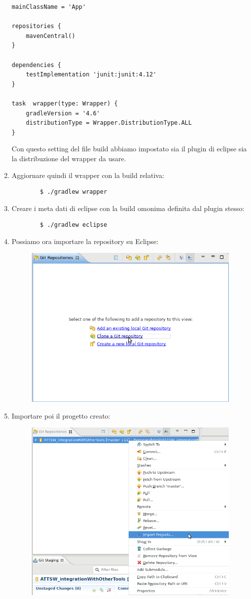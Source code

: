 \begin{enumerate}
\begin{lstlisting}[frame=single]
mainClassName = 'App'

repositories {
    mavenCentral()
}

dependencies {
    testImplementation 'junit:junit:4.12'
}

task  wrapper(type: Wrapper) {
    gradleVersion = '4.6'
    distributionType = Wrapper.DistributionType.ALL
}
    \end{lstlisting}
    Con questo setting del file build abbiamo impostato sia il plugin di eclipse sia la distribuzione del wrapper da usare.
    \item Aggiornare quindi il wrapper con la build relativa:
    \begin{verbatim}
        $ ./gradlew wrapper
    \end{verbatim}
    \item Creare i meta dati di eclipse con la build omonima definita dal plugin stesso:
    \begin{verbatim}
        $ ./gradlew eclipse
    \end{verbatim}
    \item Possiamo ora importare la repository su Eclipse:
    \begin{figure}[H]
    \centering
    \includegraphics[width=0.5\linewidth]{4IntegrationWithOtherTool/tutorial/addExistingLocalGitRepository.png}
    \end{figure}
    \item Importare poi il progetto creato:
    \begin{figure}[H]
    \centering
    \includegraphics[width=0.6\linewidth]{4IntegrationWithOtherTool/tutorial/localRepositoryEclipse.png}

\end{figure}
\end{enumerate}
